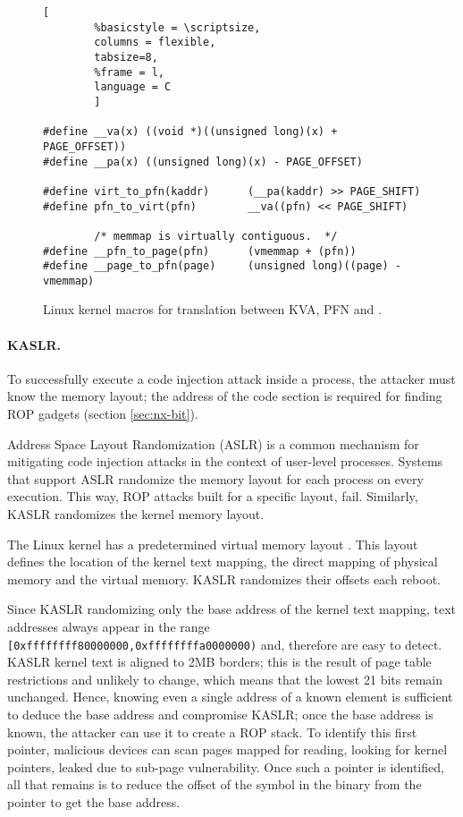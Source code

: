 \begin{figure*}[t]
                \begin{lstlisting}[
        %basicstyle = \scriptsize,
        columns = flexible,
        tabsize=8,
        %frame = l,
        language = C
        ]
        
#define __va(x) ((void *)((unsigned long)(x) + PAGE_OFFSET))
#define __pa(x) ((unsigned long)(x) - PAGE_OFFSET)

#define virt_to_pfn(kaddr)      (__pa(kaddr) >> PAGE_SHIFT)
#define pfn_to_virt(pfn)        __va((pfn) << PAGE_SHIFT)

        /* memmap is virtually contiguous.  */
#define __pfn_to_page(pfn)      (vmemmap + (pfn))  
#define __page_to_pfn(page)     (unsigned long)((page) - vmemmap)
                \end{lstlisting}
        \caption{ Linux kernel macros for translation between KVA, PFN and \page{}.
                }
        \label{fig:mem_model}
\end{figure*}

\paragraph{KASLR.}\label{sec:kaslr}

To successfully execute a code injection attack inside a process, the attacker must know the memory layout; the address of the code section is required for finding ROP gadgets (section \ref{sec:nx-bit}). 

Address Space Layout Randomization (ASLR) is a common mechanism for mitigating code injection attacks in the context of user-level processes. Systems that support ASLR randomize the memory layout for each process on every execution. This way, ROP attacks built for a specific layout, fail. Similarly, KASLR \cite{kalsr} randomizes the kernel memory layout.

The Linux kernel has a predetermined virtual memory layout \cite{mem_layout}. This layout defines the location of the kernel text mapping, the direct mapping of physical memory and the virtual memory. KASLR randomizes their offsets each reboot.

Since KASLR randomizing only the base address of the kernel text mapping, text addresses always appear in the range \texttt{[0xffffffff80000000,0xffffffffa0000000)} and, therefore are easy to detect. KASLR kernel text is aligned to 2MB borders; this is the result of page table restrictions and unlikely to change, which means that the lowest 21 bits remain unchanged. Hence, knowing even a single address of a known element is sufficient to deduce the base address and compromise KASLR; once the base address is known, the attacker can use it to create a ROP stack. To identify this first pointer, malicious devices can scan pages mapped for reading, looking for kernel pointers, leaked due to sub-page vulnerability. Once such a pointer is identified, all that remains is to reduce the offset of the symbol in the binary from the pointer to get the base address.

